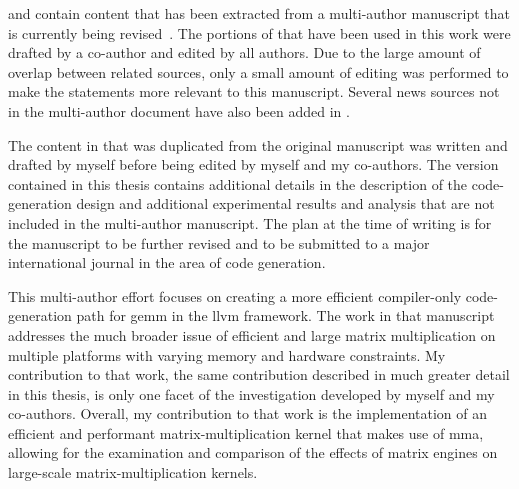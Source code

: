 \documentclass[\main/thesis.tex]{subfiles}
\begin{document}
\begin{preface}

 and  contain content that has been extracted from a multi-author manuscript that is currently being revised~\autocite{kuzma2021fast}.
The portions of  that have been used in this work were drafted by a co-author and edited by all authors.
Due to the large amount of overlap between related sources, only a small amount of editing was performed to make the statements more relevant to this manuscript.
Several news sources not in the multi-author document have also been added in .

The content in  that was duplicated from the original manuscript was written and drafted by myself before being edited by myself and my co-authors.
The version contained in this thesis contains additional details in the description of the code-generation design and additional experimental results and analysis that are not included in the multi-author manuscript.
The plan at the time of writing is for the manuscript to be further revised and to be submitted to a major international journal in the area of code generation.

This multi-author effort focuses on creating a more efficient compiler-only code-generation path for \gls{gemm} in the \gls{llvm} framework.
The work in that manuscript addresses the much broader issue of efficient and large matrix multiplication on multiple platforms with varying memory and hardware constraints.
My contribution to that work, the same contribution described in much greater detail in this thesis, is only one facet of the investigation developed by myself and my co-authors.
Overall, my contribution to that work is the implementation of an efficient and performant matrix-multiplication kernel that makes use of \gls{mma}, allowing for the examination and comparison of the effects of \glspl{matrix engine} on large-scale matrix-multiplication kernels.

%
%
\end{preface}
\end{document}
